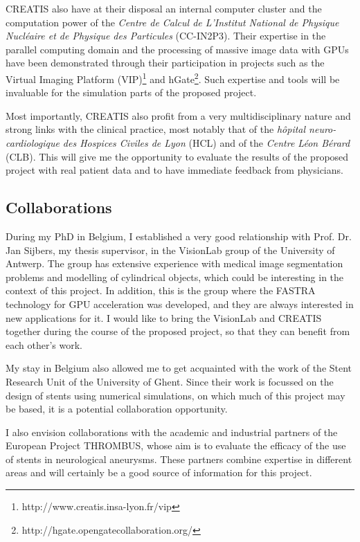 \documentclass[a4paper]{article}
\begin{document}
CREATIS also have at their disposal an internal computer cluster and the computation power of the {\it Centre de Calcul de L'Institut National de Physique Nucl\'eaire et de Physique des Particules} (CC-IN2P3). Their expertise in the parallel computing domain and the processing of massive image data with GPUs have been demonstrated through their participation in projects such as the Virtual Imaging Platform (VIP)\footnote{http://www.creatis.insa-lyon.fr/vip} and hGate\footnote{http://hgate.opengatecollaboration.org/}. Such expertise and tools will be invaluable for the simulation parts of the proposed project. 

Most importantly, CREATIS also profit from a very multidisciplinary nature and strong links with the clinical practice, most notably that of the {\it h\^opital neuro-cardiologique des Hospices Civiles de Lyon} (HCL) and of the {\it Centre L\'eon B\'erard} (CLB). This will give me the opportunity to evaluate the results of the proposed project with real patient data and to have immediate feedback from physicians. 

\subsection{Collaborations}

During my PhD in Belgium, I established a very good relationship with Prof. Dr. Jan Sijbers, my thesis supervisor, in the VisionLab group of the University of Antwerp. The group has extensive experience with medical image segmentation problems and modelling of cylindrical objects, which could be interesting in the context of this project. In addition, this is the group where the FASTRA technology for GPU acceleration was developed, and they are always interested in new applications for it. I would like to bring the VisionLab and CREATIS together during the course of the proposed project, so that they can benefit from each other's work.

My stay in Belgium also allowed me to get acquainted with the work of the Stent Research Unit of the University of Ghent. Since their work is focussed on the design of stents using numerical simulations, on which much of this project may be based, it is a potential collaboration opportunity. 

I also envision collaborations with the academic and industrial partners of the European Project THROMBUS, whose aim is to evaluate the efficacy of the use of stents in neurological aneurysms. These partners combine expertise in different areas and will certainly be a good source of information for this project.
\end{document}
